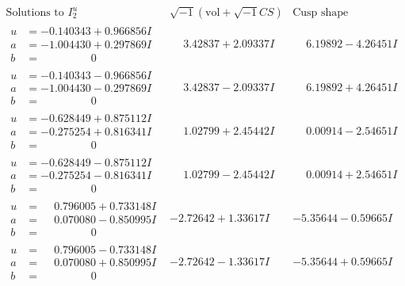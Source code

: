 \documentclass[1p]{elsarticle_modified}
\theoremstyle{definition}
\newcommand{\I}{\sqrt{-1}}
\begin{document}
$$\begin{array}{c|c|c}  
\text{Solutions to }I^u_{2}& \I (\text{vol} + \sqrt{-1}CS) & \text{Cusp shape}\\
 \hline 
\begin{aligned}
u &= -0.140343 + 0.966856 I \\
a &= -1.004430 + 0.297869 I \\
b &= \phantom{-0.000000 } 0\end{aligned}
 & \phantom{-}3.42837 + 2.09337 I & \phantom{-}6.19892 - 4.26451 I \\ \hline\begin{aligned}
u &= -0.140343 - 0.966856 I \\
a &= -1.004430 - 0.297869 I \\
b &= \phantom{-0.000000 } 0\end{aligned}
 & \phantom{-}3.42837 - 2.09337 I & \phantom{-}6.19892 + 4.26451 I \\ \hline\begin{aligned}
u &= -0.628449 + 0.875112 I \\
a &= -0.275254 + 0.816341 I \\
b &= \phantom{-0.000000 } 0\end{aligned}
 & \phantom{-}1.02799 + 2.45442 I & \phantom{-}0.00914 - 2.54651 I \\ \hline\begin{aligned}
u &= -0.628449 - 0.875112 I \\
a &= -0.275254 - 0.816341 I \\
b &= \phantom{-0.000000 } 0\end{aligned}
 & \phantom{-}1.02799 - 2.45442 I & \phantom{-}0.00914 + 2.54651 I \\ \hline\begin{aligned}
u &= \phantom{-}0.796005 + 0.733148 I \\
a &= \phantom{-}0.070080 - 0.850995 I \\
b &= \phantom{-0.000000 } 0\end{aligned}
 & -2.72642 + 1.33617 I & -5.35644 - 0.59665 I \\ \hline\begin{aligned}
u &= \phantom{-}0.796005 - 0.733148 I \\
a &= \phantom{-}0.070080 + 0.850995 I \\
b &= \phantom{-0.000000 } 0\end{aligned}
 & -2.72642 - 1.33617 I & -5.35644 + 0.59665 I \\ \hline\begin{aligned}

\end{aligned}
\end{array}$$
\end{document}
